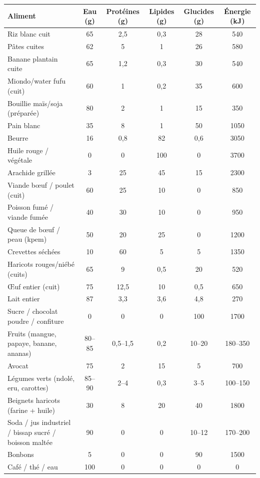 \documentclass[11pt]{article}
\begin{document}
\begin{center}
\begin{tabular}{|l|c|c|c|c|c|}\hline
\rowcolor{popgreenL}
\textbf{Aliment} & \textbf{Eau (g)} & \textbf{Protéines (g)} & \textbf{Lipides (g)} & \textbf{Glucides (g)} & \textbf{Énergie (kJ)} \\ \hline
Riz blanc cuit & 65 & 2,5 & 0,3 & 28 & 540 \\ \hline
Pâtes cuites & 62 & 5 & 1 & 26 & 580 \\ \hline
Banane plantain cuite & 65 & 1,2 & 0,3 & 30 & 540 \\ \hline
Miondo/water fufu (cuit) & 60 & 1 & 0,2 & 35 & 600 \\ \hline
Bouillie maïs/soja (préparée) & 80 & 2 & 1 & 15 & 350 \\ \hline
Pain blanc & 35 & 8 & 1 & 50 & 1050 \\ \hline
Beurre & 16 & 0,8 & 82 & 0,6 & 3050 \\ \hline
Huile rouge / végétale & 0 & 0 & 100 & 0 & 3700 \\ \hline
Arachide grillée & 3 & 25 & 45 & 15 & 2300 \\ \hline
Viande bœuf / poulet (cuit) & 60 & 25 & 10 & 0 & 850 \\ \hline
Poisson fumé / viande fumée & 40 & 30 & 10 & 0 & 950 \\ \hline
Queue de bœuf / peau (kpem) & 50 & 20 & 25 & 0 & 1200 \\ \hline
Crevettes séchées & 10 & 60 & 5 & 5 & 1350 \\ \hline
Haricots rouges/niébé (cuits) & 65 & 9 & 0,5 & 20 & 520 \\ \hline
Œuf entier (cuit) & 75 & 12,5 & 10 & 0,5 & 650 \\ \hline
Lait entier & 87 & 3,3 & 3,6 & 4,8 & 270 \\ \hline
Sucre / chocolat poudre / confiture & 0 & 0 & 0 & 100 & 1700 \\ \hline
Fruits (mangue, papaye, banane, ananas) & 80--85 & 0,5--1,5 & 0,2 & 10--20 & 180--350 \\ \hline
Avocat & 75 & 2 & 15 & 5 & 700 \\ \hline
Légumes verts (ndolé, eru, carottes) & 85--90 & 2--4 & 0,3 & 3--5 & 100--150 \\ \hline
Beignets haricots (farine + huile) & 30 & 8 & 20 & 40 & 1800 \\ \hline
Soda / jus industriel / bissap sucré / boisson maltée & 90 & 0 & 0 & 10--12 & 170--200 \\ \hline
Bonbons & 5 & 0 & 0 & 90 & 1500 \\ \hline
Café / thé / eau & 100 & 0 & 0 & 0 & 0 \\ \hline
\end{tabular}
\end{center}
\end{document}
